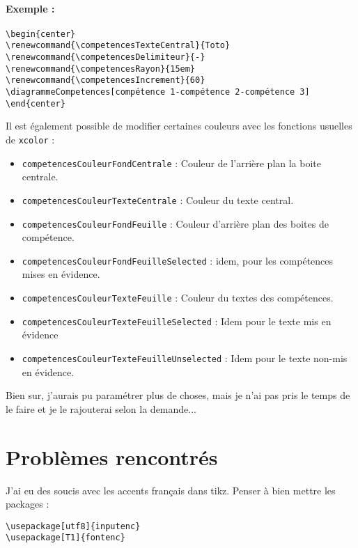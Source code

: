 \documentclass[a4paper,12pt]{article}
\begin{document}
			\paragraph{Exemple :}

			\begin{verbatim}
\begin{center}
\renewcommand{\competencesTexteCentral}{Toto}
\renewcommand{\competencesDelimiteur}{-}
\renewcommand{\competencesRayon}{15em}
\renewcommand{\competencesIncrement}{60}
\diagrammeCompetences[compétence 1-compétence 2-compétence 3]
\end{center}
			\end{verbatim}

			\begin{center}
				\renewcommand{\competencesTexteCentral}{Toto}
				\renewcommand{\competencesDelimiteur}{-}
				\renewcommand{\competencesRayon}{15em}
				\renewcommand{\competencesIncrement}{60}
			\end{center}


			Il est également possible de modifier certaines couleurs avec les fonctions usuelles de \verb!xcolor! :

			\begin{itemize}
				\item \verb!competencesCouleurFondCentrale! : Couleur de l'arrière plan la boite centrale.
				\item \verb!competencesCouleurTexteCentrale! : Couleur du texte central.
				\item \verb!competencesCouleurFondFeuille! : Couleur d'arrière plan des boites de compétence.
				\item \verb!competencesCouleurFondFeuilleSelected! : idem, pour les compétences mises en évidence.
				\item \verb!competencesCouleurTexteFeuille! : Couleur du textes des compétences.
				\item \verb!competencesCouleurTexteFeuilleSelected! : Idem pour le texte mis en évidence
				\item \verb!competencesCouleurTexteFeuilleUnselected! : Idem pour le texte non-mis en évidence.
			\end{itemize}

			Bien sur, j'aurais pu paramétrer plus de choses, mais je n'ai pas pris le temps de le faire et je le rajouterai selon la demande...
			
	\section{Problèmes rencontrés}

		J'ai eu des soucis avec les accents français dans tikz.
		Penser à bien mettre les packages :

			\begin{verbatim}
\usepackage[utf8]{inputenc}
\usepackage[T1]{fontenc}
			\end{verbatim}
\end{document}
